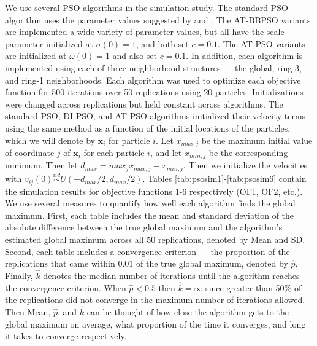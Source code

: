 \documentclass[cmbright]{staauth}
\begin{document}
We use several PSO algorithms in the simulation study. The standard PSO algorithm uses the parameter values suggested by \cite{blum2008swarm} and \cite{clerc2002particle}. The AT-BBPSO variants are implemented a wide variety of parameter values, but all have the scale parameter initialized at $\sigma(0)=1$, and both set $c=0.1$. The AT-PSO variants are initialized at $\omega(0)=1$ and also set $c=0.1$. In addition, each algorithm is implemented using each of three neighborhood structures --- the global, ring-3, and ring-1 neighborhoods. Each algorithm was used to optimize each objective function for 500 iterations over 50 replications using 20 particles. Initializations were changed across replications but held constant across algorithms. The standard PSO, DI-PSO, and AT-PSO algorithms initialized their velocity terms using the same method as a function of the initial locations of the particles, which we will denote by $\bm{x}_i$ for particle $i$. Let $x_{max,j}$ be the maximum initial value of coordinate $j$ of $\bm{x}_i$ for each particle $i$, and let $x_{min,j}$ be the corresponding minimum. Then let $d_{max} = max_{j}x_{max,j} - x_{min,j}$. Then we initialize the velocities with $v_{ij}(0)\stackrel{iid}{\sim}U(-d_{max}/2,d_{max}/2)$. Tables \ref{tab:psosim1}-\ref{tab:psosim6} contain the simulation results for objective functions 1-6 respectively (OF1, OF2, etc.). We use several measures to quantify how well each algorithm finds the global maximum. First, each table includes the mean and standard deviation of the absolute difference between the true global maximum and the algorithm's estimated global maximum across all 50 replications, denoted by Mean and SD. Second, each table includes a convergence criterion --- the proportion of the replications that came within $0.01$ of the true global maximum, denoted by $\widehat{p}$. Finally, $\widehat{k}$ denotes the median number of iterations until the algorithm reaches the convergence criterion. When $\widehat{p}<0.5$ then $\widehat{k} = \infty$ since greater than 50\% of the replications did not converge in the maximum number of iterations allowed. Then Mean, $\widehat{p}$, and $\widehat{k}$ can be thought of how close the algorithm gets to the global maximum on average, what proportion of the time it converges, and long it takes to converge respectively.
\end{document}

